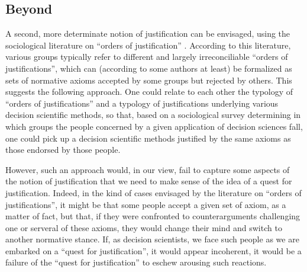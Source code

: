\documentclass[preprint, french, english, 11pt, authoryear]{elsarticle}%
\begin{document}
\subsection{Beyond}
A second, more determinate notion of justification can be envisaged, using the sociological literature on ``orders of justification'' \citep{boltanski_justification_2006}. According to this literature, various groups typically refer to different and largely irreconciliable ``orders of justifications'', which can (according to some authors at least) be formalized as sets of normative axioms accepted by some groups but rejected by others. This suggests the following approach. One could relate to each other the typology of ``orders of justifications'' and a typology of justifications underlying various decision scientific methods, so that, based on a sociological survey determining in which groups the people concerned by a given application of decision sciences fall, one could pick up a decision scientific methods justified by the same axioms as those endorsed by those people.

However, such an approach would, in our view, fail to capture some aspects of the notion of justification that we need to make sense of the idea of a quest for justification. Indeed, in the kind of cases envisaged by the literature on ``orders of justifications'', it might be that some people accept a given set of axiom, as a matter of fact, but that, if they were confronted to counterarguments challenging one or serveral of these axioms, they would change their mind and switch to another normative stance. If, as decision scientists, we face such people as we are embarked on a ``quest for justification'', it would appear incoherent, it would be a failure of the ``quest for justification'' to eschew arousing such reactions. 
\end{document}
